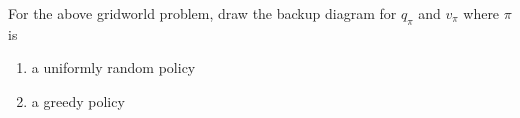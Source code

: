 For the above gridworld problem, draw the backup diagram for $q_{\pi}$ and $v_{\pi}$ where $\pi$ is
\begin{enumerate}
  \item a uniformly random policy
  \item a greedy policy
\end{enumerate}

\smallskip